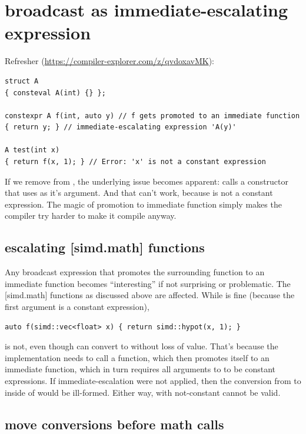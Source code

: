 \section{broadcast as immediate-escalating expression}\label{sec:math}
Refresher (\url{https://compiler-explorer.com/z/qvdoxavMK}):
\medskip\begin{lstlisting}[style=Vc]
struct A
{ consteval A(int) {} };

constexpr A f(int, auto y) // f gets promoted to an immediate function
{ return y; } // immediate-escalating expression 'A(y)'

A test(int x)
{ return f(x, 1); } // Error: 'x' is not a constant expression
\end{lstlisting}

If we remove  from , the underlying
issue becomes apparent:
 calls a  constructor that uses  as it's argument.
And that can't work, because  is not a constant expression.
The magic of promotion to immediate function simply makes the compiler try harder to make it compile
anyway.

\subsection{escalating [simd.math] functions}

Any  broadcast expression that promotes the surrounding function to an immediate
function becomes “interesting” if not surprising or problematic.
The [simd.math] functions as discussed above are affected.
While  is fine (because the first argument is a constant
expression),
\medskip\begin{lstlisting}[style=Vc]
auto f(simd::vec<float> x) { return simd::hypot(x, 1); }
\end{lstlisting}
is not, even though  can convert to  without loss of value.
That's because the  implementation needs to call a  function, which then
promotes  itself to an immediate function, which in turn requires all arguments to
 to be constant expressions.
If immediate-escalation were not applied, then the conversion from  to
 inside of  would be ill-formed.
Either way,  with not-constant  cannot be valid.

\subsection{move conversions before math calls}\label{sec:math2}

